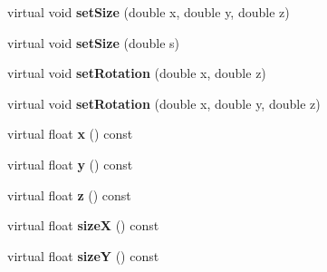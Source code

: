 \begin{DoxyCompactItemize}
\item 
\hypertarget{class_tempest_1_1_graphic_object_afe9a7ad8306b8bf603a33c75f4878bed}{virtual void {\bfseries set\+Size} (double x, double y, double z)}\label{class_tempest_1_1_graphic_object_afe9a7ad8306b8bf603a33c75f4878bed}

\item 
\hypertarget{class_tempest_1_1_graphic_object_ab1076aa36d615730bd82a5ba23078fe9}{virtual void {\bfseries set\+Size} (double s)}\label{class_tempest_1_1_graphic_object_ab1076aa36d615730bd82a5ba23078fe9}

\item 
\hypertarget{class_tempest_1_1_graphic_object_a919e48d3524948ed837fc2b0e6ef9687}{virtual void {\bfseries set\+Rotation} (double x, double z)}\label{class_tempest_1_1_graphic_object_a919e48d3524948ed837fc2b0e6ef9687}

\item 
\hypertarget{class_tempest_1_1_graphic_object_aa48dee9b537a5d002880356a050a03a8}{virtual void {\bfseries set\+Rotation} (double x, double y, double z)}\label{class_tempest_1_1_graphic_object_aa48dee9b537a5d002880356a050a03a8}

\item 
\hypertarget{class_tempest_1_1_graphic_object_a530c4c11a9940b4fbefa384d6b9b658b}{virtual float {\bfseries x} () const }\label{class_tempest_1_1_graphic_object_a530c4c11a9940b4fbefa384d6b9b658b}

\item 
\hypertarget{class_tempest_1_1_graphic_object_a2abbef896c0c7be53e9094b432f2e7c3}{virtual float {\bfseries y} () const }\label{class_tempest_1_1_graphic_object_a2abbef896c0c7be53e9094b432f2e7c3}

\item 
\hypertarget{class_tempest_1_1_graphic_object_a16d3244b05a076706dcd09ace6ecb25c}{virtual float {\bfseries z} () const }\label{class_tempest_1_1_graphic_object_a16d3244b05a076706dcd09ace6ecb25c}

\item 
\hypertarget{class_tempest_1_1_graphic_object_a18120dfb414b7ebd314f80acd6b808a7}{virtual float {\bfseries size\+X} () const }\label{class_tempest_1_1_graphic_object_a18120dfb414b7ebd314f80acd6b808a7}

\item 
\hypertarget{class_tempest_1_1_graphic_object_a0d58c741edbee85bfbaa9b2ebd4b52dd}{virtual float {\bfseries size\+Y} () const }\label{class_tempest_1_1_graphic_object_a0d58c741edbee85bfbaa9b2ebd4b52dd}


\end{DoxyCompactItemize}
